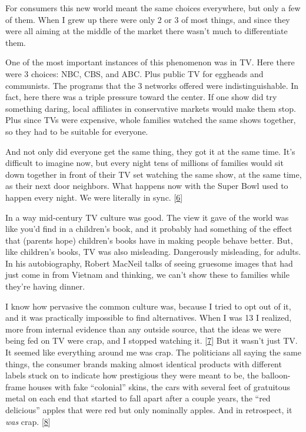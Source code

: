 For consumers this new world meant the same choices everywhere, but only
a few of them. When I grew up there were only 2 or 3 of most things, and
since they were all aiming at the middle of the market there wasn't much
to differentiate them.

One of the most important instances of this phenomenon was in TV. Here
there were 3 choices: NBC, CBS, and ABC. Plus public TV for eggheads and
communists. The programs that the 3 networks offered were
indistinguishable. In fact, here there was a triple pressure toward the
center. If one show did try something daring, local affiliates in
conservative markets would make them stop. Plus since TVs were
expensive, whole families watched the same shows together, so they had
to be suitable for everyone.

And not only did everyone get the same thing, they got it at the same
time. It's difficult to imagine now, but every night tens of millions of
families would sit down together in front of their TV set watching the
same show, at the same time, as their next door neighbors. What happens
now with the Super Bowl used to happen every night. We were literally in
sync. {[}\hyperref[f6n]{6}{]}

In a way mid-century TV culture was good. The view it gave of the world
was like you'd find in a children's book, and it probably had something
of the effect that (parents hope) children's books have in making people
behave better. But, like children's books, TV was also misleading.
Dangerously misleading, for adults. In his autobiography, Robert MacNeil
talks of seeing gruesome images that had just come in from Vietnam and
thinking, we can't show these to families while they're having dinner.

I know how pervasive the common culture was, because I tried to opt out
of it, and it was practically impossible to find alternatives. When I
was 13 I realized, more from internal evidence than any outside source,
that the ideas we were being fed on TV were crap, and I stopped watching
it. {[}\hyperref[f7n]{7}{]} But it wasn't just TV. It seemed like
everything around me was crap. The politicians all saying the same
things, the consumer brands making almost identical products with
different labels stuck on to indicate how prestigious they were meant to
be, the balloon-frame houses with fake ``colonial'' skins, the cars with
several feet of gratuitous metal on each end that started to fall apart
after a couple years, the ``red delicious'' apples that were red but
only nominally apples. And in retrospect, it \emph{was} crap.
{[}\hyperref[f8n]{8}{]}

